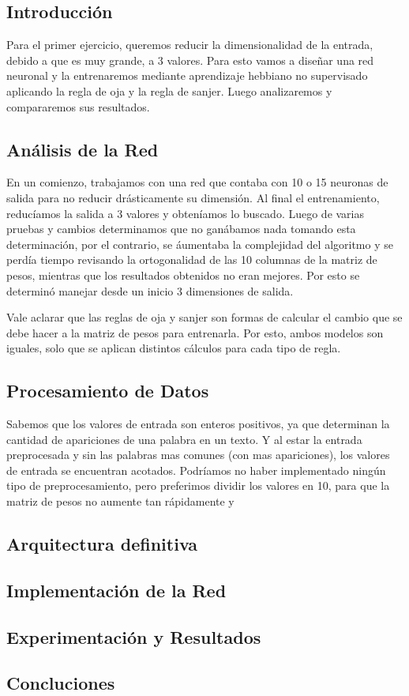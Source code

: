 \subsection{Introducción}

\par Para el primer ejercicio, queremos reducir la dimensionalidad de la entrada, debido a que es muy grande, a 3 valores. Para esto vamos a diseñar una red neuronal y la entrenaremos mediante aprendizaje hebbiano no supervisado aplicando la regla de oja y la regla de sanjer. Luego analizaremos y compararemos sus resultados.

\subsection{Análisis de la Red}

\par En un comienzo, trabajamos con una red que contaba con 10 o 15 neuronas de salida para no reducir drásticamente su dimensión. Al final el entrenamiento, reducíamos la salida a 3 valores y obteníamos lo buscado. Luego de varias pruebas y cambios determinamos que no ganábamos nada tomando esta determinación, por el contrario, se áumentaba la complejidad del algoritmo y se perdía tiempo revisando la ortogonalidad de las 10 columnas de la matriz de pesos, mientras que los resultados obtenidos no eran mejores. Por esto se determinó manejar desde un inicio 3 dimensiones de salida.

\par Vale aclarar que las reglas de oja y sanjer son formas de calcular el cambio que se debe hacer a la matriz de pesos para entrenarla. Por esto, ambos modelos son iguales, solo que se aplican distintos cálculos para cada tipo de regla.

\subsection{Procesamiento de Datos}

\par Sabemos que los valores de entrada son enteros positivos, ya que determinan la cantidad de apariciones de una palabra en un texto. Y al estar la entrada preprocesada y sin las palabras mas comunes (con mas apariciones), los valores de entrada se encuentran acotados. Podríamos no haber implementado ningún tipo de preprocesamiento, pero preferimos dividir los valores en 10, para que la matriz de pesos no aumente tan rápidamente y 

\subsection{Arquitectura definitiva}

\subsection{Implementación de la Red}

\subsection{Experimentación y Resultados}

\subsection{Concluciones}